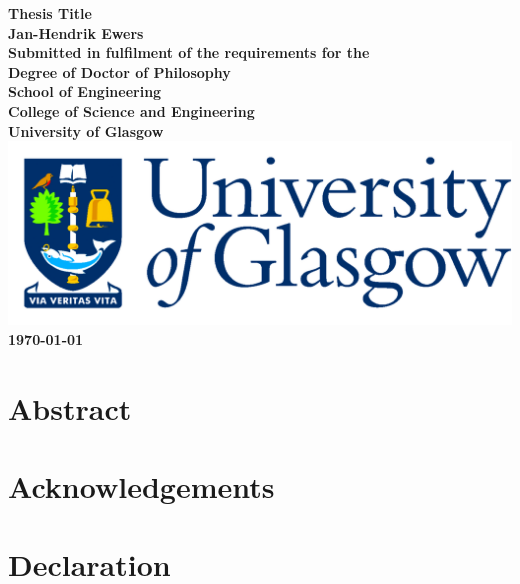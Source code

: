\documentclass[12pt,titlepage,oneside]{book}
\begin{document}
\begin{titlepage}
    \centering
    \vspace*{3cm}  %
    \bfseries\Large
    Thesis Title\\
    \vspace{3cm}
    \normalfont\large
    Jan-Hendrik Ewers\\
    \vspace{2cm}
    Submitted in fulfilment of the requirements for the\\
    Degree of Doctor of Philosophy\\
    \vspace{2cm}
    School of Engineering\\
    College of Science and Engineering\\
    University of Glasgow\\
    \vspace{1cm}
    \includegraphics[scale=0.125]{GlaLogo.pdf}
    \\
    \vspace{1cm}
    \today
\end{titlepage}
\frontmatter

\chapter{Abstract}

\listoftodos
\tableofcontents
\listoftables
\listoffigures

\chapter{Acknowledgements}

\chapter{Declaration}
\mainmatter
\end{document}
